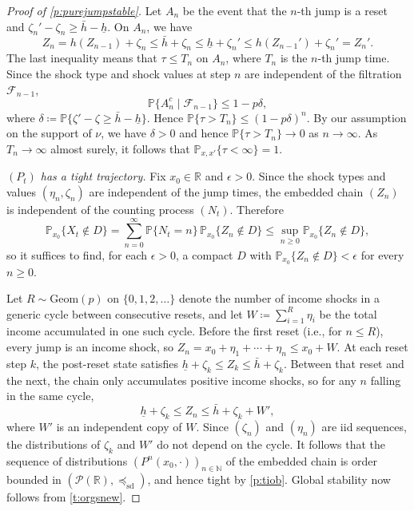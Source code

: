 \documentclass[12pt,reqno]{amsart}
\numberwithin{equation}{section}
\theoremstyle{definition}
\newcommand{\1}{\mathbbm{1}}
\newcommand{\RR}{\mathbb{R}}
\newcommand{\NN}{\mathbb{N}}
\newcommand{\PP}{\mathbb P}
\newcommand{\fF}{\mathcal{F}}
\newcommand{\pP}{\mathscr{P}}
\newcommand{\del}{\delta}
\newcommand{\ep}{\epsilon}
\newcommand{\precsd}{\preceq_{\textrm{sd}}}
\begin{document}
\begin{proof}[Proof of \cref{p:purejumpstable}]
    Let $A_n$ be the event that the $n$-th jump is a reset and
    $\zeta_n' - \zeta_n \geq \bar{h} - \underline{h}$.
    On $A_n$, we have
    \begin{equation*}
        Z_n
        = h(Z_{n-1}) + \zeta_n
        \leq \bar{h} + \zeta_n
        \leq \underline{h} + \zeta_n'
        \leq h(Z_{n-1}') + \zeta_n'
        = Z_n'.
    \end{equation*}
    The last inequality means that $\tau \leq T_n$ on $A_n$, where $T_n$ is the
    $n$-th jump time. Since the shock type and shock values at step $n$ are
    independent of the filtration $\fF_{n-1}$,
    \begin{equation*}
        \PP\{A_n^c \mid \fF_{n-1}\} \leq 1 - p\del,
    \end{equation*}
    where $\del \coloneq \PP\{\zeta' - \zeta \geq \bar{h} - \underline{h}\}$.
    Hence $\PP\{\tau > T_n\} \leq (1 - p\del)^n$. 
    By our assumption on the support of $\nu$, we have $\del >
    0$ and hence $\PP\{\tau > T_n\} \to 0$ as $n \to \infty$.
    As $T_n \to \infty$ almost surely, it follows that $\PP_{x,x'}\{\tau < \infty\} = 1$.

    \textit{$(P_t)$ has a tight trajectory.}  Fix $x_0 \in \RR$ and $\ep > 0$.
    Since the shock types and values $(\eta_n, \zeta_n)$ are independent of the
    jump times, the embedded chain $(Z_n)$ is independent of the
    counting process $(N_t)$.  Therefore
    \begin{equation*}
        \PP_{x_0}\{X_t \notin D\}
        = \sum_{n=0}^{\infty} \PP\{N_t = n\} \, \PP_{x_0}\{Z_n \notin D\}
        \leq \sup_{n \geq 0} \PP_{x_0}\{Z_n \notin D\},
    \end{equation*}
    so it suffices to find, for each $\ep > 0$, a compact $D$ with
    $\PP_{x_0}\{Z_n \notin D\} < \ep$ for every $n \geq 0$.
 

    Let $R \sim \mathrm{Geom}(p)$ on $\{0,1,2,\ldots\}$ denote the
    number of income shocks in a generic cycle between consecutive
    resets, and let $W \coloneq \sum_{i=1}^{R} \eta_i$ be the total
    income accumulated in one such cycle.
    Before the first reset (i.e., for $n \leq R$), every jump is an
    income shock, so
    $Z_n = x_0 + \eta_1 + \cdots + \eta_n \leq x_0 + W$.
    At each reset step $k$, the post-reset state satisfies
    $\underline{h} + \zeta_k \leq Z_k \leq \bar{h} + \zeta_k$.
    Between that reset and the next, the chain only accumulates
    positive income shocks, so for any $n$ falling in the same cycle,
    \begin{equation*}
        \underline{h} + \zeta_k \leq Z_n \leq \bar{h} + \zeta_k + W',
    \end{equation*}
    where $W'$ is an independent copy of $W$.
    Since $(\zeta_n)$ and $(\eta_n)$ are {\sc iid} sequences, the
    distributions of $\zeta_k$ and $W'$ do not depend on the cycle.
    It follows that the sequence of distributions $(P^n(x_0, \cdot))_{n \in \NN}$
    of the embedded chain is order bounded in $(\pP(\RR), \precsd)$,
    and hence tight by \cref{p:tiob}. Global stability now follows from \cref{t:orgsnew}.
\end{proof}
\end{document}

